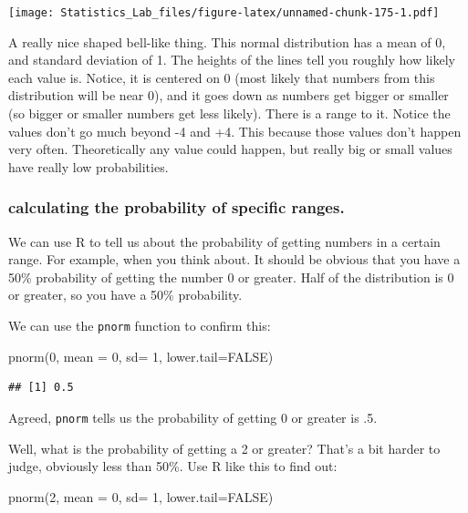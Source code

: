 \documentclass[
]{book}
\newenvironment{Shaded}{\begin{snugshade}}{\end{snugshade}}
\newcommand{\AttributeTok}[1]{\textcolor[rgb]{0.77,0.63,0.00}{#1}}
\newcommand{\ConstantTok}[1]{\textcolor[rgb]{0.00,0.00,0.00}{#1}}
\newcommand{\DecValTok}[1]{\textcolor[rgb]{0.00,0.00,0.81}{#1}}
\newcommand{\FunctionTok}[1]{\textcolor[rgb]{0.00,0.00,0.00}{#1}}
\newcommand{\NormalTok}[1]{#1}
\begin{document}
\texttt{[image: Statistics\_Lab\_files/figure-latex/unnamed-chunk-175-1.pdf]}

A really nice shaped bell-like thing. This normal distribution has a mean of 0, and standard deviation of 1. The heights of the lines tell you roughly how likely each value is. Notice, it is centered on 0 (most likely that numbers from this distribution will be near 0), and it goes down as numbers get bigger or smaller (so bigger or smaller numbers get less likely). There is a range to it. Notice the values don't go much beyond -4 and +4. This because those values don't happen very often. Theoretically any value could happen, but really big or small values have really low probabilities.

\hypertarget{calculating-the-probability-of-specific-ranges.}{%
\subsubsection{calculating the probability of specific ranges.}\label{calculating-the-probability-of-specific-ranges.}}

We can use R to tell us about the probability of getting numbers in a certain range. For example, when you think about. It should be obvious that you have a 50\% probability of getting the number 0 or greater. Half of the distribution is 0 or greater, so you have a 50\% probability.

We can use the \texttt{pnorm} function to confirm this:

\begin{Shaded}
\begin{Highlighting}[]
\FunctionTok{pnorm}\NormalTok{(}\DecValTok{0}\NormalTok{, }\AttributeTok{mean =} \DecValTok{0}\NormalTok{, }\AttributeTok{sd=} \DecValTok{1}\NormalTok{, }\AttributeTok{lower.tail=}\ConstantTok{FALSE}\NormalTok{)}
\end{Highlighting}
\end{Shaded}

\begin{verbatim}
## [1] 0.5
\end{verbatim}

Agreed, \texttt{pnorm} tells us the probability of getting 0 or greater is .5.

Well, what is the probability of getting a 2 or greater? That's a bit harder to judge, obviously less than 50\%. Use R like this to find out:

\begin{Shaded}
\begin{Highlighting}[]
\FunctionTok{pnorm}\NormalTok{(}\DecValTok{2}\NormalTok{, }\AttributeTok{mean =} \DecValTok{0}\NormalTok{, }\AttributeTok{sd=} \DecValTok{1}\NormalTok{, }\AttributeTok{lower.tail=}\ConstantTok{FALSE}\NormalTok{)}
\end{Highlighting}
\end{Shaded}
\end{document}
